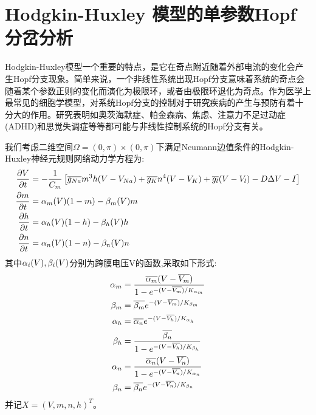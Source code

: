 \documentclass[
bachelor,
nofont, %
pdflinks,
]{xjtuthesis}
\begin{document}
\chapter{Hodgkin-Huxley 模型的单参数Hopf分岔分析}

Hodgkin-Huxley模型一个重要的特点，是它在奇点附近随着外部电流的变化会产生Hopf分支现象。简单来说，一个非线性系统出现Hopf分支意味着系统的奇点会随着某个参数正则的变化而演化为极限环，或者由极限环退化为奇点。作为医学上最常见的细胞学模型，对系统Hopf分支的控制对于研究疾病的产生与预防有着十分大的作用。研究表明如奥茨海默症、帕金森病、焦虑、注意力不足过动症(ADHD)和思觉失调症等等都可能与非线性控制系统的Hopf分支有关。

\medskip

我们考虑二维空间$\Omega=(0,\pi) \times (0,\pi)$下满足Neumann边值条件的Hodgkin-Huxley神经元规则网络动力学方程为:
\begin{align}
\notag \frac{\partial V}{\partial t} &= -\dfrac{1}{C_m} \left[ \overline{g_{Na}} m^3h(V-V_{Na})+ \overline{g_{K}} n^4(V-V_{K})+\overline{g_l}(V-V_{l}) -D \Delta V -I \right] \\
\frac{\partial m}{\partial t} &= \alpha_m (V)(1-m)-\beta_m (V)m \\
\notag \frac{\partial h}{\partial t} &= \alpha_h (V)(1-h)-\beta_h (V)h \\
\notag \frac{\partial n}{\partial t} &= \alpha_n (V)(1-n)-\beta_n (V)n 
\end{align}
其中$\alpha_i (V), \beta_i (V)$分别为跨膜电压V的函数,采取如下形式:
\begin{align}
\notag \alpha_m &= \dfrac{\overline{\alpha_m} (V-\overline{V_m})}{1- e^{-(V-\overline{V_m})/K_{\alpha_m}}} \\
\notag \beta_m &= \overline{\beta_m} e^{-(V-\overline{V_m})/K_{\beta_m}}\\
\notag \alpha_h &= \overline{\alpha_n} e^{-(V-\overline{V_h})/K_{\alpha_h}}\\
\beta_h &= \dfrac{\overline{\beta_n} }{1- e^{-(V-\overline{V_h})/K_{\beta_h}}} \\
\notag \alpha_n &= \dfrac{\overline{\alpha_n} (V-\overline{V_n})}{1- e^{-(V-\overline{V_n})/K_{\alpha_n}}} \\
\notag \beta_n &= \overline{\beta_n} e^{-(V-\overline{V_n})/K_{\beta_n}}
\end{align}
并记$X=(V,m,n,h)^T$。
\end{document}
